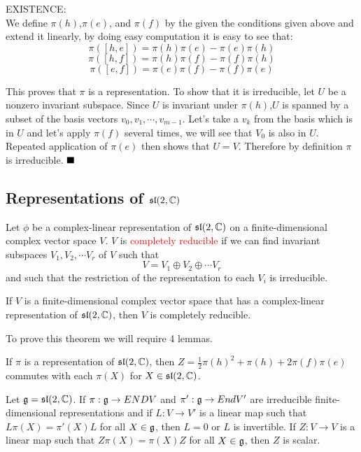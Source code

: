 \documentclass{article}
\begin{document}
EXISTENCE:\\
We define $\pi(h)$,$\pi(e)$, and $\pi(f)$ by the given the conditions given above and extend it linearly, by doing easy computation it is easy to see that:\\
$$\pi([h,e])=\pi(h)\pi(e)-\pi(e)\pi(h) $$
$$\pi([h,f])=\pi(h)\pi(f)-\pi(f)\pi(h) $$
$$\pi([e,f])=\pi(e)\pi(f)-\pi(f)\pi(e) $$

This proves that $\pi$ is a representation. To show that it is irreducible, let $U$ be a nonzero invariant subspace. Since $U$ is invariant under $\pi(h)$,$U$ is spanned by a subset of the basis vectors ${v_0,v_1,\cdots, v_{m-1}}$. Let's take a $v_k$ from the basis which is in $U$ and let's apply $\pi(f)$ several times, we will see that $V_0$ is also in $U$. Repeated application of $\pi(e)$ then shows that $U=V$. Therefore by definition $\pi$ is irreducible.
$\qed$


\subsection{Representations of $\mathfrak{sl}(2,\mathbb{C})$}
\begin{definition}
Let $\phi$ be a complex-linear representation of $\mathfrak{sl}(2,\mathbb{C})$ on a finite-dimensional complex vector space $V$. $V$ is \textcolor{red}{completely reducible} if we can find invariant subspaces $V_1,V_2,\cdots V_r$ of $V$ such that 
$$V=V_1\oplus V_2 \oplus \cdots V_r $$ and such that the restriction of the representation to each $V_i$ is irreducible.  
\end{definition}
\begin{theorem} 
If $V$ is a finite-dimensional complex vector space that has a complex-linear representation of $\mathfrak{sl}(2,\mathbb{C})$, then $V$ is completely reducible. 
\end{theorem}

To prove this theorem we will require 4 lemmas.
\begin{lemma}
If $\pi$ is a representation of $\mathfrak{sl}(2,\mathbb{C})$, then $Z=\frac{1}{2}\pi(h)^2+\pi(h)+2\pi(f)\pi(e)$ commutes with each $\pi(X)$ for $X\in \mathfrak{sl}(2,\mathbb{C})$.
\end{lemma}

\begin{lemma}
Let $\mathfrak{g}=\mathfrak{sl}(2,\mathbb{C})$. If $\pi:\mathfrak{g}\rightarrow ENDV$ and $\pi':\mathfrak{g}\rightarrow EndV'$ are irreducible finite-dimensional representations and if $L:V\rightarrow V'$ is a linear map such that $L\pi(X)=\pi'(X)L$ for all $X\in \mathfrak{g}$, then $L=0$ or $L$ is invertible. If $Z:V\rightarrow V$ is a linear map such that $Z\pi(X)=\pi(X)Z$ for all $X\in \mathfrak{g}$, then $Z$ is scalar. 
\end{lemma}
\end{document}

